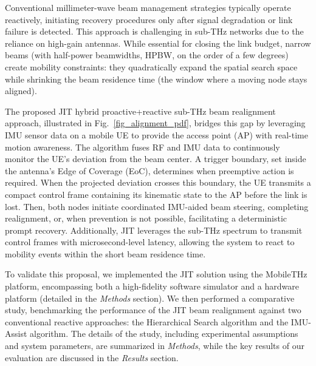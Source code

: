 \documentclass[fleqn,10pt]{wlscirep}
\newcommand{\rev}[1]{{\color{revblue}#1}}
\begin{document}
Conventional millimeter-wave beam management strategies typically operate reactively, initiating recovery procedures only after signal degradation or link failure is detected\cite{Giordani2018ATO, Wang2022}. This approach is challenging in sub-THz networks due to the reliance on high-gain antennas\cite{Kleine-Ostmann2011}. While essential for closing the link budget, narrow beams \rev{(with half-power beamwidths, HPBW, on the order of a few degrees)} create mobility constraints: they quadratically expand the spatial search space while shrinking the beam residence time (the window where a moving node stays aligned).

The proposed JIT hybrid proactive+reactive sub-THz beam realignment approach, illustrated in Fig.~\ref{fig_alignment_pdf}, bridges this gap by leveraging IMU sensor data on a mobile UE to provide the access point (AP) with real-time motion awareness. The algorithm fuses RF and IMU data to continuously monitor the UE's deviation from the beam center. A trigger boundary, set inside the antenna's Edge of Coverage (EoC), determines when preemptive action is required. When the projected deviation crosses this boundary, the UE transmits a compact control frame containing its kinematic state to the AP before the link is lost. Then, both nodes initiate coordinated IMU-aided beam steering, completing realignment, or, when prevention is not possible, facilitating a deterministic prompt recovery. Additionally, JIT leverages the sub-THz spectrum to transmit control frames with microsecond-level latency, allowing the system to react to mobility events within the short beam residence time.

To validate this proposal, we implemented the JIT solution using the MobileTHz platform, encompassing both a high-fidelity software simulator and a hardware platform (detailed in the \textit{Methods} section). We then performed a comparative study, benchmarking the performance of the JIT beam realignment against two conventional reactive approaches: the Hierarchical Search algorithm and the IMU-Assist algorithm. The details of the study, including experimental assumptions and system parameters, are summarized in \textit{Methods}, while the key results of our evaluation are discussed in the \textit{Results} section.



\end{document}
